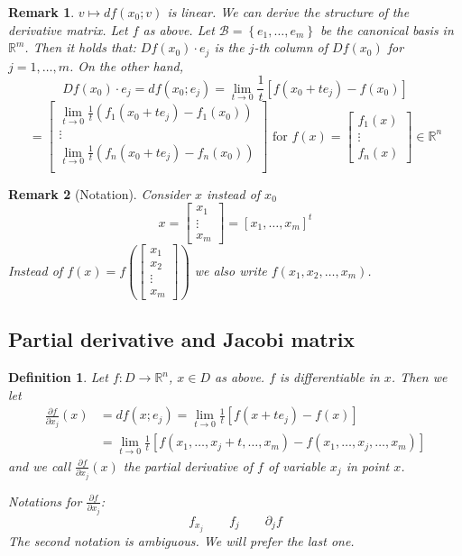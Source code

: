 \documentclass{article}
\newtheorem{definition}{Definition}  \numberwithin{definition}{section}
\newtheorem{remark}{Remark}  \numberwithin{remark}{section}
\newcommand{\set}[1]{\left\{#1\right\}}
\begin{document}
\begin{remark}
  $v \mapsto df(x_0; v)$ is linear. We can derive the structure of the derivative matrix.
  Let $f$ as above. Let $\mathcal B = \set{e_1, \dots, e_m}$ be the canonical basis in $\mathbb R^m$.
  Then it holds that: $Df(x_0) \cdot e_j$ is the $j$-th column of $Df(x_0)$ for $j=1,\dots,m$.
  On the other hand,
  \[ Df(x_0) \cdot e_j = df(x_0; e_j) = \lim_{t\to0} \frac1{t} \left[f(x_0 + te_j) - f(x_0)\right] \]
  \[
    = \begin{bmatrix}
      \lim_{t\to 0} \frac1t \left(f_1(x_0 + te_j) - f_1(x_0)\right) \\
      \vdots \\
      \lim_{t\to 0} \frac1t \left(f_n(x_0 + te_j) - f_n(x_0)\right) \\
    \end{bmatrix}
    \text{ for }
    f(x) = \begin{bmatrix} f_1(x) \\ \vdots \\ f_n(x) \end{bmatrix} \in \mathbb R^n
  \]
\end{remark}
\begin{remark}[Notation]
  Consider $x$ instead of $x_0$
  \[ x = \begin{bmatrix} x_1 \\ \vdots \\ x_m \end{bmatrix} = [x_1, \dots, x_m]^t \]
  Instead of $f(x) = f\left(\begin{bmatrix} x_1 \\ x_2 \\ \vdots \\ x_m \end{bmatrix}\right)$
  we also write $f(x_1, x_2, \dots, x_m)$.
\end{remark}

\subsection{Partial derivative and Jacobi matrix}
\begin{definition} %
  Let $f: D \to \mathbb R^n$, $x \in D$ as above. $f$ is differentiable in $x$. Then we let
  \begin{align*}
    \frac{\partial f}{\partial x_j}(x)
      &= df(x; e_j) = \lim_{t\to0} \frac1t \left[f(x + te_j) - f(x)\right] \\
      &= \lim_{t\to0} \frac1t \left[f(x_1, \dots, x_j + t, \dots, x_m) - f(x_1, \dots, x_j, \dots, x_m)\right]
  \end{align*}
  and we call $\frac{\partial f}{\partial x_j} (x)$ the \emph{partial derivative} of $f$ of variable $x_j$ in point $x$.
  
  Notations for $\frac{\partial f}{\partial x_j}$:
  \[ f_{x_j} \qquad f_j \qquad \partial_j f \]
  The second notation is ambiguous. We will prefer the last one.
\end{definition}
\end{document}
